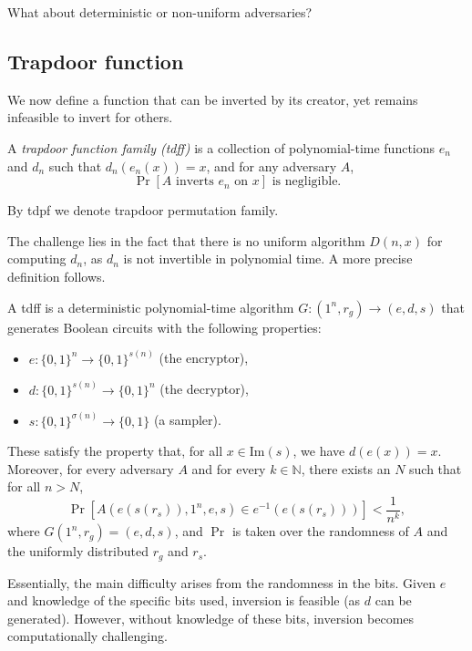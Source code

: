 \begin{exercise}
    What about deterministic or non-uniform adversaries?
\end{exercise}

\subsection{Trapdoor function}

We now define a function that can be inverted by its creator, yet remains infeasible to invert for others.

\begin{definition}
    A \emph{trapdoor function family (tdff)} is a collection of polynomial-time functions $e_n$ and $d_n$ such that $d_n(e_n(x)) = x$, and for any adversary $A$,
    \[
        \Pr[A \text{ inverts } e_n \text{ on } x] \text{ is negligible}.
    \]
\end{definition}
By tdpf we denote trapdoor permutation family.

The challenge lies in the fact that there is no uniform algorithm $D(n, x)$ for computing $d_n$, as $d_n$ is not invertible in polynomial time. A more precise definition follows.

\begin{definition}
    A tdff is a deterministic polynomial-time algorithm $G \colon (1^n, r_g) \to (e, d, s)$ that generates Boolean circuits with the following properties:
    \begin{itemize}
        \item $e \colon \{0, 1\}^n \to \{0, 1\}^{s(n)}$ (the encryptor),
        \item $d \colon \{0, 1\}^{s(n)} \to \{0, 1\}^n$ (the decryptor),
        \item $s \colon \{0, 1\}^{\sigma(n)} \to \{0, 1\}$ (a sampler).
    \end{itemize}
    These satisfy the property that, for all $x \in \text{Im}(s)$, we have $d(e(x)) = x$. Moreover, for every adversary $A$ and for every $k \in \mathbb{N}$, there exists an $N$ such that for all $n > N$,
    \[
        \Pr[A(e(s(r_s)), 1^n, e, s) \in e^{-1}(e(s(r_s)))] < \frac{1}{n^k},
    \]
    where $G(1^n, r_g) = (e, d, s)$, and $\Pr$ is taken over the randomness of $A$ and the uniformly distributed $r_g$ and $r_s$.
\end{definition}

Essentially, the main difficulty arises from the randomness in the bits.
Given $e$ and knowledge of the specific bits used, inversion is feasible (as $d$ can be generated).
However, without knowledge of these bits, inversion becomes computationally challenging.

